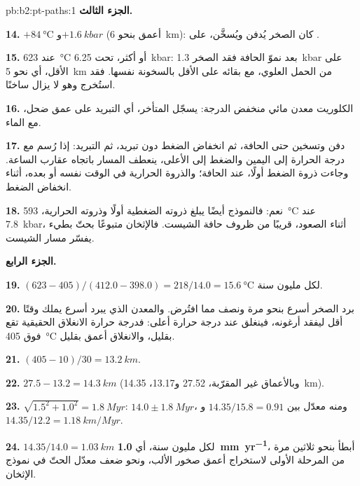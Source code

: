 \begin{solution}{pb:b2:pt-paths:1}
\noindent\textbf{الجزء الثالث.}

\textbf{14.} $+\qty{84}{\celsius}$ و$+\qty{1.6}{kbar}$ (أعمق بنحو \qty{6}{km}): كان
الصخر يُدفن ويُسخَّن، على .

\textbf{15.} عند \qty{623}{\celsius} أو أكثر، تحت \qty{6.25}{kbar}: بعد نموّ الحافة
فقد الصخر \qty{1.3}{kbar} على الأقل، أي نحو \qty{5}{km} من الحمل العلوي، مع بقائه على
الأقل بالسخونة نفسها. فقد استُخرج وهو لا يزال ساخنًا.

\textbf{16.} الكلوريت معدن مائي منخفض الدرجة: يسجّل 
المتأخر، أي التبريد على عمق ضحل، مع الماء.

\textbf{17.} دفن وتسخين حتى الحافة، ثم انخفاض الضغط دون تبريد، ثم التبريد:
إذا رُسم مع درجة الحرارة إلى اليمين والضغط إلى الأعلى، ينعطف المسار باتجاه عقارب الساعة.
وجاءت ذروة الضغط أولًا، عند الحافة؛ والذروة الحرارية في الوقت نفسه أو بعده، أثناء
انخفاض الضغط.

\textbf{18.} نعم: فالنموذج أيضًا يبلغ ذروته الضغطية أولًا وذروته الحرارية،
\qty{593}{\celsius} عند \qty{7.8}{kbar}، أثناء الصعود، قريبًا من ظروف حافة
الشيست. فالإثخان متبوعًا بحتّ بطيء يفسّر مسار الشيست.

\noindent\textbf{الجزء الرابع.}

\textbf{19.} $(623 - 405)/(412.0 - 398.0) = 218/14.0 = \qty{15.6}{\celsius}$ لكل مليون
سنة.

\textbf{20.} برد الصخر أسرع بنحو مرة ونصف مما افتُرض. والمعدن
الذي يبرد أسرع يملك وقتًا أقل ليفقد أرغونه، فينغلق عند درجة حرارة أعلى:
فدرجة حرارة الانغلاق الحقيقية تقع فوق \qty{405}{\celsius} بقليل، والانغلاق
أعمق بقليل.

\textbf{21.} $(405 - 10)/30 = \qty{13.2}{km}$.

\textbf{22.} $27.5 - 13.2 = \qty{14.3}{km}$ (وبالأعماق غير المقرّبة، 27.52 و13.17،
\qty{14.35}{km}).

\textbf{23.} $\sqrt{1.5^2 + 1.0^2} = \qty{1.8}{Myr}$: $14.0 \pm \qty{1.8}{Myr}$، ومنه معدّل
بين $14.35/15.8 = 0.91$ و$14.35/12.2 = \qty{1.18}{km/Myr}$.

\textbf{24.} $14.35/14.0 = \qty{1.03}{km}$ لكل مليون سنة، أي
\textbf{\qty[text-series-to-math=true]{1.0}{mm.yr^{-1}}}، أبطأ بنحو ثلاثين مرة من
المرحلة الأولى لاستخراج أعمق صخور الألب، ونحو ضعف معدّل الحتّ
في نموذج الإثخان.
\end{solution}
